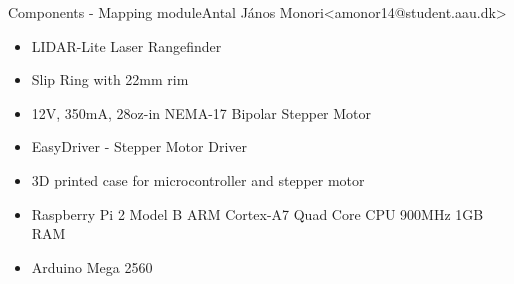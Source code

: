 \begin{frame}{Components - Mapping module}{Antal János Monori\newline<amonor14@student.aau.dk>}
	\begin{itemize}
		\item LIDAR-Lite Laser Rangefinder
		\item Slip Ring with 22mm rim
		\item 12V, 350mA, 28oz-in NEMA-17 Bipolar Stepper Motor
		\item EasyDriver - Stepper Motor Driver
		\item 3D printed case for microcontroller and stepper motor
		\item Raspberry Pi 2 Model B ARM Cortex-A7 Quad Core CPU 900MHz 1GB RAM 
		\item Arduino Mega 2560
	\end{itemize}
\end{frame}